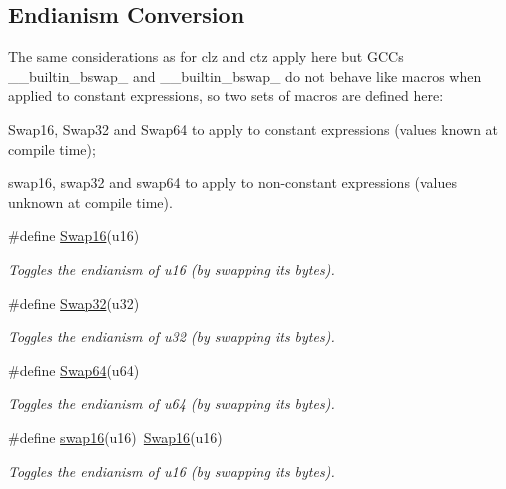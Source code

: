 \subsection*{Endianism Conversion}
\label{_amgrpdbefbc0e3fd569bb2d3a4f2dd9915efb}%
The same considerations as for clz and ctz apply here but G\+CC\textquotesingle{}s \+\_\+\+\_\+builtin\+\_\+bswap\+\_ and \+\_\+\+\_\+builtin\+\_\+bswap\+\_ do not behave like macros when applied to constant expressions, so two sets of macros are defined here\+:
\begin{DoxyItemize}
\item Swap16, Swap32 and Swap64 to apply to constant expressions (values known at compile time);
\item swap16, swap32 and swap64 to apply to non-\/constant expressions (values unknown at compile time). 
\end{DoxyItemize}\begin{DoxyCompactItemize}
\item 
\#define \mbox{\hyperlink{group__group__sam0__utils_gadc9a009f53db3e7c3294ee6bc1027dca}{Swap16}}(u16)
\begin{DoxyCompactList}\small\item\em Toggles the endianism of {\itshape u16} (by swapping its bytes). \end{DoxyCompactList}\item 
\#define \mbox{\hyperlink{group__group__sam0__utils_ga5e9bc2e3b3e43eadc3210b02cab6ac64}{Swap32}}(u32)
\begin{DoxyCompactList}\small\item\em Toggles the endianism of {\itshape u32} (by swapping its bytes). \end{DoxyCompactList}\item 
\#define \mbox{\hyperlink{group__group__sam0__utils_ga33f3049d9b8374e8b93d5642bfe7f426}{Swap64}}(u64)
\begin{DoxyCompactList}\small\item\em Toggles the endianism of {\itshape u64} (by swapping its bytes). \end{DoxyCompactList}\item 
\#define \mbox{\hyperlink{group__group__sam0__utils_ga3067f71c33a89726a107430050253045}{swap16}}(u16)~\mbox{\hyperlink{group__group__sam0__utils_gadc9a009f53db3e7c3294ee6bc1027dca}{Swap16}}(u16)
\begin{DoxyCompactList}\small\item\em Toggles the endianism of {\itshape u16} (by swapping its bytes). \end{DoxyCompactList}\item 

\end{DoxyCompactItemize}
